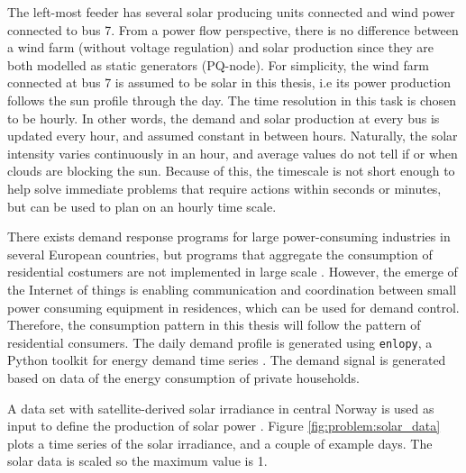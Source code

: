 \documentclass[class=book, crop=false, 11pt]{standalone}
\begin{document}
The left-most feeder has several solar producing units connected and wind power connected to bus 7. From a power flow perspective, there is no difference between a wind farm (without voltage regulation) and solar production since they are both modelled as static generators (PQ-node). For simplicity, the wind farm connected at bus 7 is assumed to be solar in this thesis, i.e its power production follows the sun profile through the day. The time resolution in this task is chosen to be hourly. In other words, the demand and solar production at every bus is updated every hour, and assumed constant in between hours. Naturally, the solar intensity varies continuously in an hour, and average values do not tell if or when clouds are blocking the sun. Because of this, the timescale is not short enough to help solve immediate problems that require actions within seconds or minutes, but can be used to plan on an hourly time scale. 

There exists demand response programs for large power-consuming industries in several European countries, but programs that aggregate the consumption of residential costumers are not implemented in large scale \cite{koliou2014_aggregator}. However, the emerge of the Internet of things is enabling communication and coordination between small power consuming equipment in residences, which can be used for demand control. Therefore, the consumption pattern in this thesis will follow the pattern of residential consumers. The daily demand profile is generated using \texttt{enlopy}, a Python toolkit for energy demand time series \cite{enlopy}. The demand signal is generated based on data of the energy consumption of private households. 

A data set with satellite-derived solar irradiance in central Norway is used as input to define the production of solar power \cite{solar_data}. Figure \ref{fig:problem:solar_data} plots a time series of the solar irradiance, and a couple of example days. The solar data is scaled so the maximum value is 1.
\end{document}
